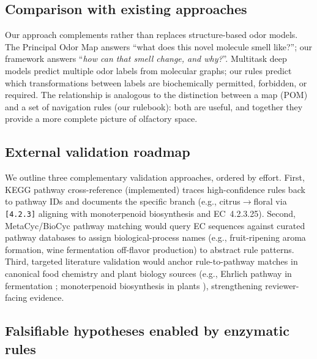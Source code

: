 \documentclass[a4paper,fleqn]{cas-sc}
\begin{document}
\subsection{Comparison with existing approaches}

Our approach complements rather than replaces structure-based odor models. The Principal Odor Map \citep{Lee2023} answers ``what does this novel molecule smell like?''; our framework answers ``\emph{how can that smell change, and why?}''. Multitask deep models \citep{Song2025} predict multiple odor labels from molecular graphs; our rules predict which transformations between labels are biochemically permitted, forbidden, or required. The relationship is analogous to the distinction between a map (POM) and a set of navigation rules (our rulebook): both are useful, and together they provide a more complete picture of olfactory space.

\subsection{External validation roadmap}

We outline three complementary validation approaches, ordered by effort. First, KEGG pathway cross-reference (implemented) traces high-confidence rules back to pathway IDs and documents the specific branch (e.g., citrus$\rightarrow$floral via \texttt{[4.2.3]} aligning with monoterpenoid biosynthesis and EC~4.2.3.25). Second, MetaCyc/BioCyc pathway matching would query EC sequences against curated pathway databases to assign biological-process names (e.g., fruit-ripening aroma formation, wine fermentation off-flavor production) to abstract rule patterns. Third, targeted literature validation would anchor rule-to-pathway matches in canonical food chemistry and plant biology sources (e.g., Ehrlich pathway in fermentation \citep{Hazelwood2008}; monoterpenoid biosynthesis in plants \citep{Tholl2015}), strengthening reviewer-facing evidence.

\subsection{Falsifiable hypotheses enabled by enzymatic rules}\label{sec:hypotheses}
\end{document}
